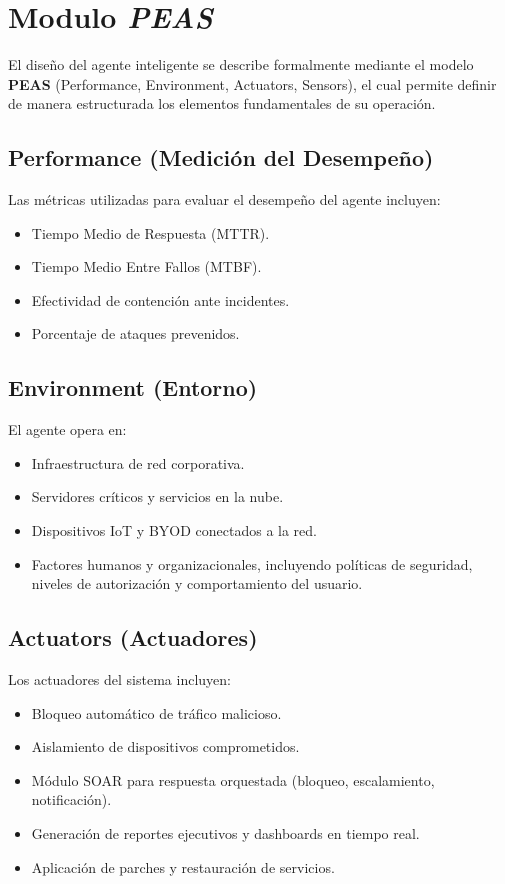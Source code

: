 \section{Modulo \textit{PEAS}}

El diseño del agente inteligente se describe formalmente mediante el modelo
\textbf{PEAS} (Performance, Environment, Actuators, Sensors), el cual permite
definir de manera estructurada los elementos fundamentales de su operación.

\subsection{Performance (Medición del Desempeño)}
Las métricas utilizadas para evaluar el desempeño del agente incluyen:
\begin{itemize}
    \item Tiempo Medio de Respuesta (MTTR).
    \item Tiempo Medio Entre Fallos (MTBF).
    \item Efectividad de contención ante incidentes.
    \item Porcentaje de ataques prevenidos.
\end{itemize}

\subsection{Environment (Entorno)}
El agente opera en:
\begin{itemize}
    \item Infraestructura de red corporativa.
    \item Servidores críticos y servicios en la nube.
    \item Dispositivos IoT y BYOD conectados a la red.
    \item Factores humanos y organizacionales, incluyendo políticas de seguridad, niveles
          de autorización y comportamiento del usuario.
\end{itemize}

\subsection{Actuators (Actuadores)}
Los actuadores del sistema incluyen:
\begin{itemize}
    \item Bloqueo automático de tráfico malicioso.
    \item Aislamiento de dispositivos comprometidos.
    \item Módulo SOAR para respuesta orquestada (bloqueo, escalamiento, notificación).
    \item Generación de reportes ejecutivos y dashboards en tiempo real.
    \item Aplicación de parches y restauración de servicios.
\end{itemize}

